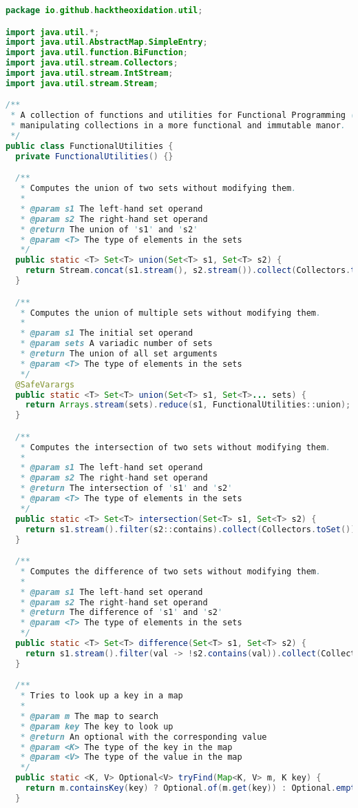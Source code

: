 \begin{lstlisting}[language=Java]
package io.github.hacktheoxidation.util;

import java.util.*;
import java.util.AbstractMap.SimpleEntry;
import java.util.function.BiFunction;
import java.util.stream.Collectors;
import java.util.stream.IntStream;
import java.util.stream.Stream;

/**
 * A collection of functions and utilities for Functional Programming (FP) in Java. Mostly for
 * manipulating collections in a more functional and immutable manor.
 */
public class FunctionalUtilities {
  private FunctionalUtilities() {}

  /**
   * Computes the union of two sets without modifying them.
   *
   * @param s1 The left-hand set operand
   * @param s2 The right-hand set operand
   * @return The union of 's1' and 's2'
   * @param <T> The type of elements in the sets
   */
  public static <T> Set<T> union(Set<T> s1, Set<T> s2) {
    return Stream.concat(s1.stream(), s2.stream()).collect(Collectors.toSet());
  }

  /**
   * Computes the union of multiple sets without modifying them.
   *
   * @param s1 The initial set operand
   * @param sets A variadic number of sets
   * @return The union of all set arguments
   * @param <T> The type of elements in the sets
   */
  @SafeVarargs
  public static <T> Set<T> union(Set<T> s1, Set<T>... sets) {
    return Arrays.stream(sets).reduce(s1, FunctionalUtilities::union);
  }

  /**
   * Computes the intersection of two sets without modifying them.
   *
   * @param s1 The left-hand set operand
   * @param s2 The right-hand set operand
   * @return The intersection of 's1' and 's2'
   * @param <T> The type of elements in the sets
   */
  public static <T> Set<T> intersection(Set<T> s1, Set<T> s2) {
    return s1.stream().filter(s2::contains).collect(Collectors.toSet());
  }

  /**
   * Computes the difference of two sets without modifying them.
   *
   * @param s1 The left-hand set operand
   * @param s2 The right-hand set operand
   * @return The difference of 's1' and 's2'
   * @param <T> The type of elements in the sets
   */
  public static <T> Set<T> difference(Set<T> s1, Set<T> s2) {
    return s1.stream().filter(val -> !s2.contains(val)).collect(Collectors.toSet());
  }

  /**
   * Tries to look up a key in a map
   *
   * @param m The map to search
   * @param key The key to look up
   * @return An optional with the corresponding value
   * @param <K> The type of the key in the map
   * @param <V> The type of the value in the map
   */
  public static <K, V> Optional<V> tryFind(Map<K, V> m, K key) {
    return m.containsKey(key) ? Optional.of(m.get(key)) : Optional.empty();
  }


\end{lstlisting}
